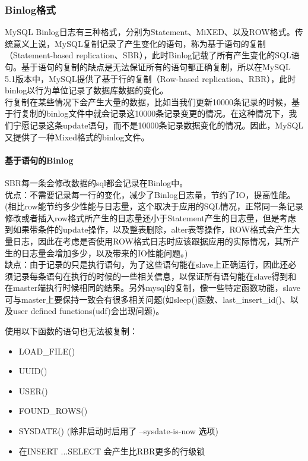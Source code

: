 \documentclass[a4paper, titlepage, 10pt, bookmark]{article}
\begin{document}
\subsubsection{Binlog格式}
MySQL Binlog日志有三种格式，分别为Statement、MiXED、以及ROW格式。传统意义上说，MySQL复制记录了产生变化的语句，称为基于语句的复制（Statement-based replication、SBR），此时Binlog记载了所有产生变化的SQL语句。基于语句的复制的缺点是无法保证所有的语句都正确复制，所以在MySQL 5.1版本中，MySQL提供了基于行的复制（Row-based replication、RBR），此时binlog以行为单位记录了数据库数据的变化。\\

行复制在某些情况下会产生大量的数据，比如当我们更新10000条记录的时候，基于行复制的binlog文件中就会记录这10000条记录变更的情况。在这种情况下，我们宁愿记录这条update语句，而不是10000条记录数据变化的情况。因此，MySQL又提供了一种Mixed格式的binlog文件。

\paragraph{基于语句的Binlog}
SBR每一条会修改数据的sql都会记录在Binlog中。\\

优点：不需要记录每一行的变化，减少了Binlog日志量，节约了IO，提高性能。(相比row能节约多少性能与日志量，这个取决于应用的SQL情况，正常同一条记录修改或者插入row格式所产生的日志量还小于Statement产生的日志量，但是考虑到如果带条件的update操作，以及整表删除，alter表等操作，ROW格式会产生大量日志，因此在考虑是否使用ROW格式日志时应该跟据应用的实际情况，其所产生的日志量会增加多少，以及带来的IO性能问题。)\\

缺点：由于记录的只是执行语句，为了这些语句能在slave上正确运行，因此还必须记录每条语句在执行的时候的一些相关信息，以保证所有语句能在slave得到和在master端执行时候相同的结果。另外mysql的复制，像一些特定函数功能，slave可与master上要保持一致会有很多相关问题(如sleep()函数、last\_insert\_id()、以及user defined functions(udf)会出现问题)。

使用以下函数的语句也无法被复制：
\begin{itemize}
    \item LOAD\_FILE()
    \item UUID()
    \item USER()
    \item FOUND\_ROWS()
    \item SYSDATE() (除非启动时启用了 --sysdate-is-now 选项)
    \item 在INSERT ...SELECT 会产生比RBR更多的行级锁
\end{itemize}
\end{document}
